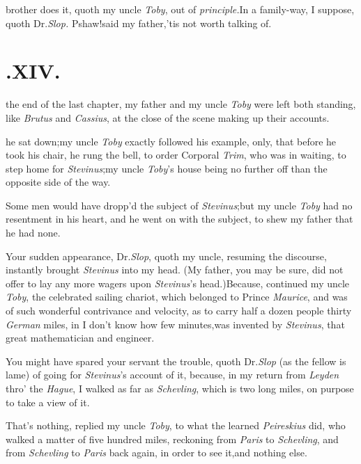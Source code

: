 \documentclass{article}
\begin{document}
 brother does it, quoth my uncle
\textit{Toby}, out of \textit{principle.}\tsh In a family-way,
I suppose, quoth Dr.\@ \textit{Slop.}\tsh\break
Pshaw!\tsk said my father,\tsk ’tis not worth\break
talking of.


\null
\section{.\enspace  XIV.}

 the end of the last chapter, my\break
father and my uncle \textit{Toby} were left both standing, like
\textit{Brutus} and \textit{Cassius}, at the close of the scene making
up their accounts.

\break
\tsk he sat down;\tsk my uncle \textit{Toby}
exactly followed his example, only, that before he took his chair, he rung the bell,
to order Corporal \textit{Trim}, who was in waiting, to step home for
\textit{Stevinus};\tsk my uncle \textit{Toby}’s house being no further off than the
opposite side of the way.

Some men would have dropp’d the subject of
\textit{Stevinus};\tsk but my uncle \textit{Toby} had no resentment
in his heart, and he went on with the subject, to shew my father
that he had none.

Your sudden appearance, Dr.\@ \textit{Slop},\break
quoth my uncle,
resuming the discourse, instantly brought \textit{Stevinus} into my
head. (My father, you may be sure, did not offer to lay any more
wagers upon \textit{Stevinus}’s head.)\tsh Because, continued my
uncle \textit{Toby}, the celebrated sailing chariot,
which belonged to Prince \textit{Maurice}, and was of such wonderful
contrivance and velocity, as to carry half a dozen people thirty
\textit{German} miles, in I don’t know how few
minutes,\tsh was invented by \textit{Stevinus}, that great
mathematician and engineer.

You might have spared your servant the trouble, quoth Dr.\@ \textit{Slop} (as the fellow is lame) of going for
\textit{Stevinus}’s account of it, because, in my return from
\textit{Leyden} thro’ the \textit{Hague}, I walked as far as
\textit{Schev\-ling}, which is two long miles, on
purpose\break 
to take a view of it.

\tsk That’s nothing, replied my uncle \textit{Toby}, to what the
learned \textit{Peireskius} did, who walked a matter of five hundred
miles, reckoning from \textit{Paris} to
\textit{Schevling}, and from
\textit{Schevling} to \textit{Paris} back again, in order to see
it,\tsk and nothing else.
\end{document}
